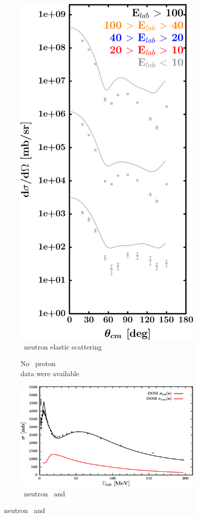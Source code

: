 \begin{figure}[hbtp]
\begin{subfigure}[c]{0.39\textheight}
        \includegraphics[width=0.52\linewidth]{figures/ni64_neutronElastic.png}
        \caption{\niFour\ neutron elastic scattering}
        \label{DOMFitData_ni64_neutron_elastic}
    \end{subfigure}\vspace{0.70in}
    \begin{subfigure}[c]{0.45\textwidth}
        \centering
        \caption{No \niFour\ proton \rxn\\ data were available}
        \label{DOMFitData_ni64_proton_inelastic}
    \end{subfigure}\hspace{6pt}
    \begin{subfigure}[c]{0.45\textwidth}
        \centering
        \includegraphics[width=\linewidth]{figures/ni64_neutronInelastic.png}
        \caption{\niFour\ neutron \rxn\ and \tot}
        \label{DOMFitData_ni64_neutron_inelastic}
    \end{subfigure}
\end{figure}
